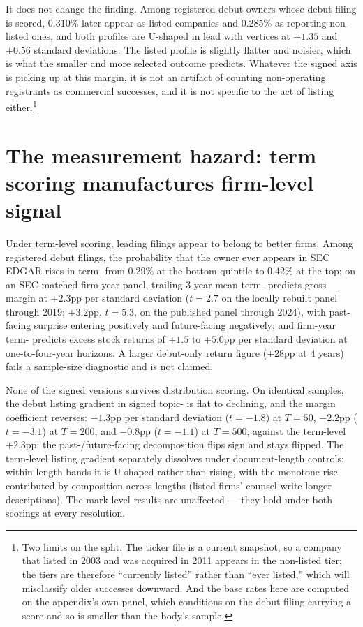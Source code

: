 It does not change the finding. Among registered debut owners whose debut
filing is scored, $0.310$\% later appear as listed companies and $0.285$\% as
reporting non-listed ones, and both profiles are U-shaped in lead with vertices
at $+1.35$ and $+0.56$ standard deviations. The listed profile is slightly
flatter and noisier, which is what the smaller and more selected outcome
predicts. Whatever the signed axis is picking up at this margin, it is not an
artifact of counting non-operating registrants as commercial successes, and it
is not specific to the act of listing either.\footnote{Two limits on the split.
The ticker file is a current snapshot, so a company that listed in 2003 and was
acquired in 2011 appears in the non-listed tier; the tiers are therefore
``currently listed'' rather than ``ever listed,'' which will misclassify older
successes downward. And the base rates here are computed on the appendix's own
panel, which conditions on the debut filing carrying a score and so is smaller
than the body's sample.}

\section{The measurement hazard: term scoring manufactures firm-level signal}\label{app:hazard}

Under term-level scoring, leading filings appear to belong to
better firms. Among registered debut filings, the probability that the
owner ever appears in SEC EDGAR rises in term-\dkl{} from 0.29\% at the
bottom quintile to 0.42\% at the top; on an SEC-matched firm-year panel,
trailing 3-year mean term-\dkl{} predicts gross margin at $+2.3$pp per
standard deviation ($t = 2.7$ on the locally rebuilt panel through 2019; $+3.2$pp,
$t = 5.3$, on the published panel through 2024), with past-facing
surprise entering positively and future-facing negatively; and firm-year
term-\dkl{} predicts excess stock returns of $+1.5$ to $+5.0$pp per
standard deviation at one-to-four-year horizons. A larger debut-only return figure
($+28$pp at 4 years) fails a sample-size diagnostic and is not claimed.

None of the signed versions survives distribution scoring. On identical
samples, the debut listing gradient in signed topic-\dkl{} is flat to
declining, and the margin coefficient reverses: $-1.3$pp per standard deviation
($t = -1.8$) at $T = 50$, $-2.2$pp ($t = -3.1$) at $T = 200$, and
$-0.8$pp ($t = -1.1$) at $T = 500$, against the term-level $+2.3$pp;
the past-/future-facing decomposition flips sign and stays
flipped. The term-level listing gradient separately dissolves under
document-length controls: within length bands it is U-shaped rather than
rising, with the monotone rise contributed by composition across lengths
(listed firms' counsel write longer descriptions). The mark-level
results are unaffected --- they hold under both scorings at every
resolution.

